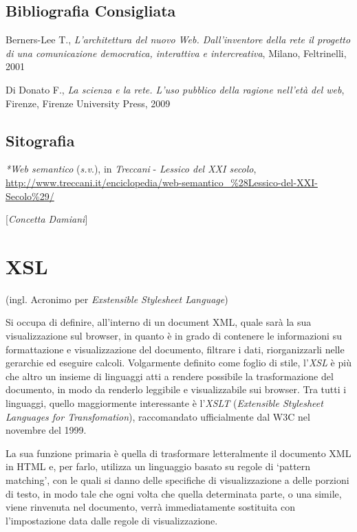 \section*{Bibliografia Consigliata}
{\parindent0pt 
Berners-Lee T., \emph{L'architettura del nuovo Web. Dall'inventore della
rete il progetto di una comunicazione democratica, interattiva e
intercreativa}, Milano, Feltrinelli, 2001

Di Donato F., \emph{La scienza e la rete. L'uso pubblico della ragione
nell'età del web}, Firenze, Firenze University Press, 2009
}

\section*{Sitografia}
{\parindent0pt 
\emph{*Web semantico} (\emph{s.v}.), in \emph{Treccani} - \emph{Lessico
del XXI secolo},
\url{http://www.treccani.it/enciclopedia/web-semantico_\%28Lessico-del-XXI-Secolo\%29/}

}

\hrulefill 

{[}\emph{Concetta Damiani}{]}




\chapter{XSL}

(ingl. Acronimo per \emph{Exstensible Stylesheet Language})

Si occupa di definire, all'interno di un document XML, quale sarà la sua
visualizzazione sul browser, in quanto è in grado di contenere le
informazioni su formattazione e visualizzazione del documento, filtrare
i dati, riorganizzarli nelle gerarchie ed eseguire calcoli. Volgarmente
definito come foglio di stile, l'\emph{XSL} è più che altro un insieme
di linguaggi atti a rendere possibile la trasformazione del documento,
in modo da renderlo leggibile e visualizzabile sui browser. Tra tutti i
linguaggi, quello maggiormente interessante è l'\emph{XSLT}
(\emph{Extensible Stylesheet Languages for Transfomation}), raccomandato
ufficialmente dal W3C nel novembre del 1999.

La sua funzione primaria è quella di trasformare letteralmente il
documento XML in HTML e, per farlo, utilizza un linguaggio basato su
regole di `pattern matching', con le quali si danno delle specifiche di
visualizzazione a delle porzioni di testo, in modo tale che ogni volta
che quella determinata parte, o una simile, viene rinvenuta nel
documento, verrà immediatamente sostituita con l'impostazione data dalle
regole di visualizzazione.

